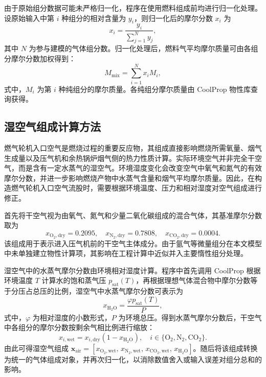 由于原始组分数据可能未严格归一化，程序在使用燃料组成前均进行归一化处理。设原始输入中第 \(i\) 种组分的相对含量为 \(y_i\)，则归一化后的摩尔分数 \(x_i\) 为
\begin{equation}\label{eq:mole-fraction-normalize}
x_i = \frac{y_i}{\sum_{j=1}^{N} y_j},
\end{equation}
其中 \(N\) 为参与建模的气体组分数。归一化处理后，燃料气平均摩尔质量可由各组分摩尔分数加权得到：
\begin{equation}\label{eq:mix-molar-mass}
M_{\mathrm{mix}} = \sum_{i=1}^{N} x_i M_i,
\end{equation}
式中，\(M_i\) 为第 \(i\) 种纯组分的摩尔质量。各纯组分摩尔质量由 CoolProp 物性库查询获得。

\subsection{湿空气组成计算方法}

燃气轮机入口空气是燃烧过程的重要反应物，其组成直接影响燃烧所需氧量、烟气生成量以及压气机和余热锅炉烟气侧的热力性质计算。实际环境空气并非完全干空气，而是含有一定水蒸气的湿空气。环境湿度变化会改变空气中氧气和氮气的有效摩尔分数，并进一步影响燃烧产物中水蒸气含量和烟气平均摩尔质量。因此，在构造燃气轮机入口空气流股时，需要根据环境温度、压力和相对湿度对空气组成进行修正。

首先将干空气视为由氧气、氮气和少量二氧化碳组成的混合气体，其基准摩尔分数取为
\begin{equation}\label{eq:dry-air-composition}
x_{\mathrm{O_2,dry}} = 0.2095,\quad
x_{\mathrm{N_2,dry}} = 0.7808,\quad
x_{\mathrm{CO_2,dry}} = 0.0004 .
\end{equation}
该组成用于表示进入压气机前的干空气主体成分。由于氩气等微量组分在本文模型中未单独建立物性计算项，其影响在工程计算中近似并入主要惰性组分处理。

湿空气中的水蒸气摩尔分数由环境相对湿度计算。程序中首先调用 CoolProp 根据环境温度 \(T\) 计算水的饱和蒸气压 \(p_{\mathrm{sat}}(T)\)，再根据理想气体混合物中摩尔分数等于分压占总压的比例，湿空气中水蒸气摩尔分数可表示为
\begin{equation}\label{eq:humid-air-h2o}
x_{\mathrm{H_2O}} = \frac{\varphi p_{\mathrm{sat}}(T)}{P},
\end{equation}
式中，\(\varphi\) 为相对湿度的小数形式，\(P\) 为环境总压。得到水蒸气摩尔分数后，干空气中各组分的摩尔分数按剩余气相比例进行缩放：
\begin{equation}\label{eq:wet-air-scaling}
x_{i,\mathrm{wet}} = x_{i,\mathrm{dry}}\left(1-x_{\mathrm{H_2O}}\right),
\quad
i \in \{\mathrm{O_2},\mathrm{N_2},\mathrm{CO_2}\}.
\end{equation}
由此可得湿空气组成 $\boldsymbol{x}_{\mathrm{air}}=\left[x_{\mathrm{O_2,wet}},\,x_{\mathrm{N_2,wet}},\,x_{\mathrm{CO_2,wet}},\,x_{\mathrm{H_2O}}\right]$。随后将该组成转换为统一的气体组成对象，并再次归一化，以消除数值舍入或输入误差对组分总和的影响。

